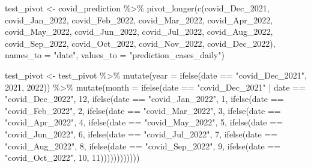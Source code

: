 \documentclass[
]{book}
\newenvironment{Shaded}{\begin{snugshade}}{\end{snugshade}}
\newcommand{\AttributeTok}[1]{\textcolor[rgb]{0.77,0.63,0.00}{#1}}
\newcommand{\DecValTok}[1]{\textcolor[rgb]{0.00,0.00,0.81}{#1}}
\newcommand{\FunctionTok}[1]{\textcolor[rgb]{0.00,0.00,0.00}{#1}}
\newcommand{\NormalTok}[1]{#1}
\newcommand{\OtherTok}[1]{\textcolor[rgb]{0.56,0.35,0.01}{#1}}
\newcommand{\SpecialCharTok}[1]{\textcolor[rgb]{0.00,0.00,0.00}{#1}}
\newcommand{\StringTok}[1]{\textcolor[rgb]{0.31,0.60,0.02}{#1}}
\begin{document}
\begin{Shaded}
\begin{Highlighting}[]
\NormalTok{test\_pivot }\OtherTok{\textless{}{-}}\NormalTok{ covid\_prediction }\SpecialCharTok{\%\textgreater{}\%}
  \FunctionTok{pivot\_longer}\NormalTok{(}\FunctionTok{c}\NormalTok{(covid\_Dec\_2021, covid\_Jan\_2022, covid\_Feb\_2022, covid\_Mar\_2022, covid\_Apr\_2022, covid\_May\_2022, covid\_Jun\_2022, covid\_Jul\_2022, covid\_Aug\_2022, covid\_Sep\_2022, covid\_Oct\_2022, covid\_Nov\_2022, covid\_Dec\_2022), }\AttributeTok{names\_to =} \StringTok{"date"}\NormalTok{, }\AttributeTok{values\_to =} \StringTok{"prediction\_cases\_daily"}\NormalTok{)}

\NormalTok{test\_pivot }\OtherTok{\textless{}{-}}\NormalTok{ test\_pivot }\SpecialCharTok{\%\textgreater{}\%}
  \FunctionTok{mutate}\NormalTok{(}\AttributeTok{year =} \FunctionTok{ifelse}\NormalTok{(date }\SpecialCharTok{==} \StringTok{"covid\_Dec\_2021"}\NormalTok{, }\DecValTok{2021}\NormalTok{, }\DecValTok{2022}\NormalTok{)) }\SpecialCharTok{\%\textgreater{}\%}
  \FunctionTok{mutate}\NormalTok{(}\AttributeTok{month =} \FunctionTok{ifelse}\NormalTok{(date }\SpecialCharTok{==} \StringTok{"covid\_Dec\_2021"} \SpecialCharTok{|}\NormalTok{ date }\SpecialCharTok{==} \StringTok{"covid\_Dec\_2022"}\NormalTok{, }\DecValTok{12}\NormalTok{, }\FunctionTok{ifelse}\NormalTok{(date }\SpecialCharTok{==} \StringTok{"covid\_Jan\_2022"}\NormalTok{, }\DecValTok{1}\NormalTok{, }\FunctionTok{ifelse}\NormalTok{(date }\SpecialCharTok{==} \StringTok{"covid\_Feb\_2022"}\NormalTok{, }\DecValTok{2}\NormalTok{, }\FunctionTok{ifelse}\NormalTok{(date }\SpecialCharTok{==} \StringTok{"covid\_Mar\_2022"}\NormalTok{, }\DecValTok{3}\NormalTok{, }\FunctionTok{ifelse}\NormalTok{(date }\SpecialCharTok{==} \StringTok{"covid\_Apr\_2022"}\NormalTok{, }\DecValTok{4}\NormalTok{, }\FunctionTok{ifelse}\NormalTok{(date }\SpecialCharTok{==} \StringTok{"covid\_May\_2022"}\NormalTok{, }\DecValTok{5}\NormalTok{, }\FunctionTok{ifelse}\NormalTok{(date }\SpecialCharTok{==} \StringTok{"covid\_Jun\_2022"}\NormalTok{, }\DecValTok{6}\NormalTok{, }\FunctionTok{ifelse}\NormalTok{(date }\SpecialCharTok{==} \StringTok{"covid\_Jul\_2022"}\NormalTok{, }\DecValTok{7}\NormalTok{, }\FunctionTok{ifelse}\NormalTok{(date }\SpecialCharTok{==} \StringTok{"covid\_Aug\_2022"}\NormalTok{, }\DecValTok{8}\NormalTok{, }\FunctionTok{ifelse}\NormalTok{(date }\SpecialCharTok{==} \StringTok{"covid\_Sep\_2022"}\NormalTok{, }\DecValTok{9}\NormalTok{, }\FunctionTok{ifelse}\NormalTok{(date }\SpecialCharTok{==} \StringTok{"covid\_Oct\_2022"}\NormalTok{, }\DecValTok{10}\NormalTok{, }\DecValTok{11}\NormalTok{))))))))))))}
  

\end{Highlighting}
\end{Shaded}
\end{document}

